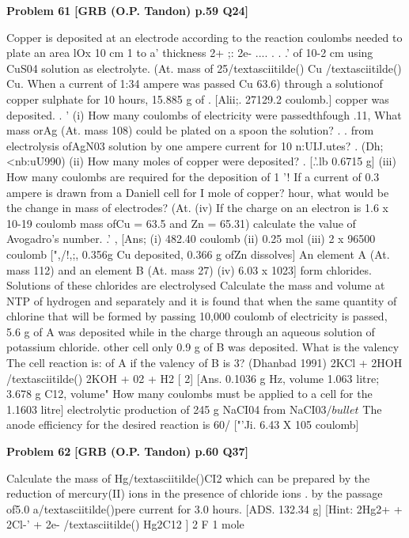 \begin{problembox}
\textbf{Problem 61} \hfill \textbf{[GRB (O.P. Tandon) p.59 Q24]}
\label{q:ext-grb_all_questions-61}

Copper is deposited at an electrode according to the reaction 
coulombs needed to plate an area lOx 10 cm
1 to a' thickness 
2+ ;: 2e-
.... 
. 
. .' 
of 10-2 cm using CuS04 solution as electrolyte. (At. mass of 
25/textasciitilde() 
Cu 
/textasciitilde() 
Cu. When a current of 1:34 ampere was passed 
Cu 
63.6) 
through a solutionof copper sulphate for 10 hours, 15.885 g of 
. 
[Alii;. 27129.2 coulomb.] 
copper was deposited. 
. ' 
(i) How many coulombs of electricity were passedthfough 
.11, What mass orAg (At. mass 108) could be plated on a spoon 
the solution? 
. . 
from electrolysis ofAgN03 solution by one ampere current for 
10 n:UIJ.utes? 
. 
(Dh;<nb:uU990) 
(ii) How many moles of copper were deposited? 
. 
[.'.lb 0.6715 g] 
(iii) How many coulombs are required for the deposition of 1 
'! If a current of 0.3 ampere is drawn from a Daniell cell for I 
mole of copper? 
hour, what would be the change in mass of electrodes? (At. 
(iv) If the charge on an electron is 1.6 x 10-19 coulomb 
mass ofCu = 63.5 and Zn = 65.31) 
calculate the value of Avogadro's number. .' 
, 
[Ans; (i) 482.40 coulomb (ii) 0.25 mol (iii) 2 x 96500 coulomb 
[",/!,;, 0.356g Cu deposited, 0.366 g ofZn dissolves] 
An element A (At. mass 112) and an element B (At. mass 27) 
(iv) 6.03 x 1023] 
form chlorides. Solutions of these chlorides are electrolysed 
Calculate the mass and volume at NTP of hydrogen and 
separately and it is found that when the same quantity of 
chlorine that will be formed by passing 10,000 coulomb of 
electricity is passed, 5.6 g of A was deposited while in the 
charge through an aqueous solution of potassium chloride. 
other cell only 0.9 g of B was deposited. What is the valency 
The cell reaction is: 
of A if the valency of B is 3? 
(Dhanbad 1991) 
2KCl + 2HOH /textasciitilde() 
2KOH + 02 + H2 
[ 
2] 
[Ans. 0.1036 g Hz, volume 1.063 litre; 3.678 g C12, volume" How many coulombs must be applied to a cell for the 
1.1603 litre] 
electrolytic production of 245 g NaCI04 from NaCI03$/bullet$ The 
anode efficiency for the desired reaction is 60/%
["'Ji. 6.43 X 105 coulomb]
\end{problembox}

\begin{problembox}
\textbf{Problem 62} \hfill \textbf{[GRB (O.P. Tandon) p.60 Q37]}
\label{q:ext-grb_all_questions-62}

Calculate the mass of Hg/textasciitilde()CI2 which can be prepared by the 
reduction of mercury(II) ions in the presence of chloride ions . 
by the passage of5.0 a/textasciitilde()pere current for 3.0 hours. 
[ADS. 
132.34 g] 
[Hint: 
2Hg2+ + 2Cl-' + 2e- /textasciitilde() 
Hg2C12 ] 
2 F 
1 mole
\end{problembox}

